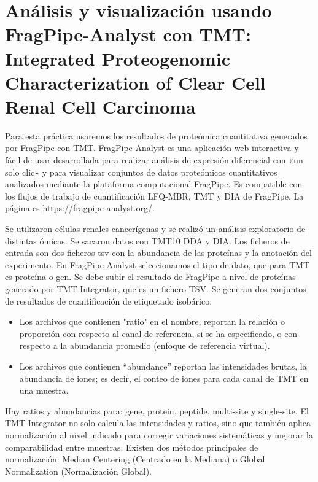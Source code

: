 \documentclass[nochap]{config/ejercicios}
\begin{document}
\section{Análisis y visualización usando FragPipe-Analyst con TMT: Integrated Proteogenomic Characterization of Clear Cell Renal Cell Carcinoma}
Para esta práctica usaremos los resultados de proteómica cuantitativa generados por FragPipe con TMT.
FragPipe-Analyst es una aplicación web interactiva y fácil de usar desarrollada para realizar análisis de expresión diferencial con «un solo clic» y para visualizar conjuntos de datos proteómicos cuantitativos analizados mediante la plataforma computacional FragPipe. Es compatible con los flujos de trabajo de cuantificación LFQ-MBR, TMT y DIA de FragPipe. La página es \href{https://fragpipe-analyst.org/}{https://fragpipe-analyst.org/}.

Se utilizaron células renales cancerígenas y se realizó un análisis exploratorio de distintas ómicas. Se sacaron datos con TMT10 DDA y DIA. Los ficheros de entrada son dos ficheros tsv con la abundancia de las proteínas y la anotación del experimento. En FragPipe-Analyst seleccionamos el tipo de dato, que para TMT es proteína o gen. Se debe subir el resultado de FragPipe a nivel de proteínas generado por TMT-Integrator, que es un fichero TSV. Se generan dos conjuntos de resultados de cuantificación de etiquetado isobárico: 
\begin{itemize}
\item Los archivos que contienen "ratio" en el nombre, reportan la relación o proporción con respecto al canal de referencia, si se ha especificado, o con respecto a la abundancia promedio (enfoque de referencia virtual). 
\item Los archivos que contienen “abundance” reportan las intensidades brutas, la abundancia de iones; es decir, el conteo de iones para cada canal de TMT en una muestra.
\end{itemize}
Hay ratios y abundancias para: gene, protein, peptide, multi-site y single-site. El TMT-Integrator no solo calcula las intensidades y ratios, sino que también aplica normalización al nivel indicado para corregir variaciones sistemáticas y mejorar la comparabilidad entre muestras. Existen dos métodos principales de
normalización: Median Centering (Centrado en la Mediana) o Global Normalization (Normalización Global). 
\end{document}

